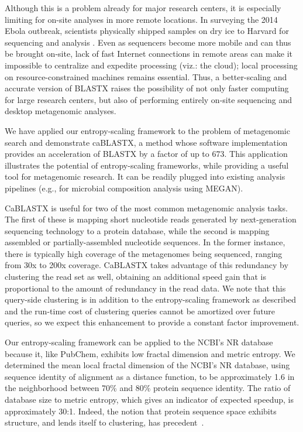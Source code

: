 \documentclass[review,preprint,12pt]{elsarticle}
\renewcommand{\cite}{\citep} %
\theoremstyle{definition}
\theoremstyle{remark}
\numberwithin{equation}{section}
\begin{document}
Although this is a problem already for major research centers, it is especially
limiting for on-site analyses in more remote locations.
In surveying the 2014 Ebola outbreak, scientists physically shipped samples on 
dry ice to Harvard for sequencing and analysis \cite{gire2014genomic}.
Even as sequencers become more mobile and can thus be brought on-site, lack of fast Internet connections in remote
areas can make it impossible to centralize and expedite processing (viz.: the cloud);
local processing on resource-constrained machines remains essential.
Thus, a better-scaling and accurate version of BLASTX raises the possibility of 
not only faster computing for large research centers, but also of performing
entirely on-site sequencing and desktop metagenomic analyses.

We have applied our entropy-scaling framework to the problem of 
metagenomic search and demonstrate caBLASTX, a method whose software 
implementation provides an acceleration of BLASTX by a factor of up 
to 673.
This application illustrates the potential of entropy-scaling frameworks, while
providing a useful tool for metagenomic research.
It can be readily plugged into existing analysis pipelines (e.g., for microbial 
composition analysis using MEGAN).

CaBLASTX is useful for two of the most common metagenomic analysis tasks. 
The first of these is mapping short nucleotide reads generated by next-generation sequencing technology to a protein database,
while the second is mapping assembled or partially-assembled
nucleotide sequences.
In the former instance, there is typically high coverage of the metagenomes
being sequenced, ranging from 30x to 200x coverage.
CaBLASTX takes advantage of this redundancy
by clustering the read set as well, obtaining an additional speed gain that is
proportional to the amount of redundancy in the read data.
We note that this query-side clustering is in addition to the entropy-scaling
framework as described and the run-time cost of clustering queries cannot
be amortized over future queries, so
we expect this enhancement to provide a 
constant factor improvement.

Our entropy-scaling framework can be applied to the NCBI's NR database because it, 
like PubChem, exhibits low fractal dimension and metric entropy.
We determined the mean local fractal dimension of the NCBI's NR database, using 
sequence identity of alignment as a distance function, to be approximately 1.6 
in the neighborhood between 70\% and 80\% protein sequence identity.
The ratio of database size to metric entropy, which gives an indicator of expected speedup,
is approximately 30:1.
Indeed, the notion that protein sequence space exhibits structure, 
and lends itself to clustering, has precedent~\cite{linial1997global}.
\end{document}
